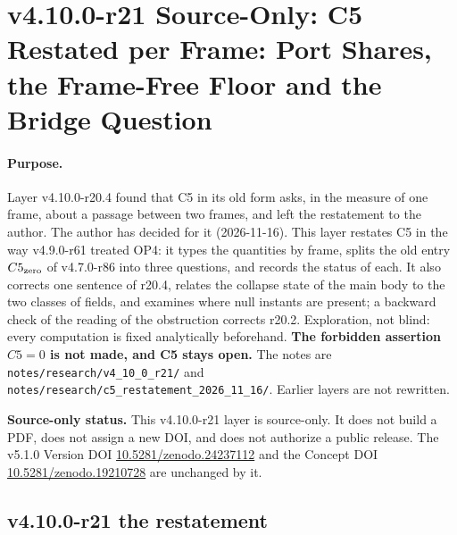 
\clearpage
\section*{v4.10.0-r21 Source-Only: C5 Restated per Frame: Port Shares, the Frame-Free Floor and the Bridge Question}
\label{sec:v4100-r21-c5-restated}

\paragraph{Purpose.}
Layer v4.10.0-r20.4 found that C5 in its old form asks, in the measure of one frame, about a passage between two frames, and left the
restatement to the author.  The author has decided for it (2026-11-16).  This layer restates C5 in the way v4.9.0-r61 treated OP4: it
types the quantities by frame, splits the old entry \(C5_{\rm zero}\) of v4.7.0-r86 into three questions, and records the status of
each.  It also corrects one sentence of r20.4, relates the collapse state of the main body to the two classes of fields, and
examines where null instants are present; a backward check of the reading of the obstruction
corrects r20.2.  Exploration, not blind: every computation is fixed analytically beforehand.
\textbf{The forbidden assertion \(C5=0\) is not made, and C5 stays open.}  The notes are
\texttt{notes/\allowbreak research/\allowbreak v4\_10\_0\_r21/} and
\texttt{notes/\allowbreak research/\allowbreak c5\_restatement\_2026\_11\_16/}.  Earlier layers are not rewritten.

\noindent\textbf{Source-only status.}
This v4.10.0-r21 layer is source-only.  It does not build a PDF, does not assign a new DOI,
and does not authorize a public release.  The v5.1.0 Version DOI
\href{https://doi.org/10.5281/zenodo.24237112}{10.5281/zenodo.24237112} and the Concept DOI
\href{https://doi.org/10.5281/zenodo.19210728}{10.5281/zenodo.19210728} are unchanged by it.

\subsection*{v4.10.0-r21 the restatement}
\label{subsec:v4100-r21-restatement}

